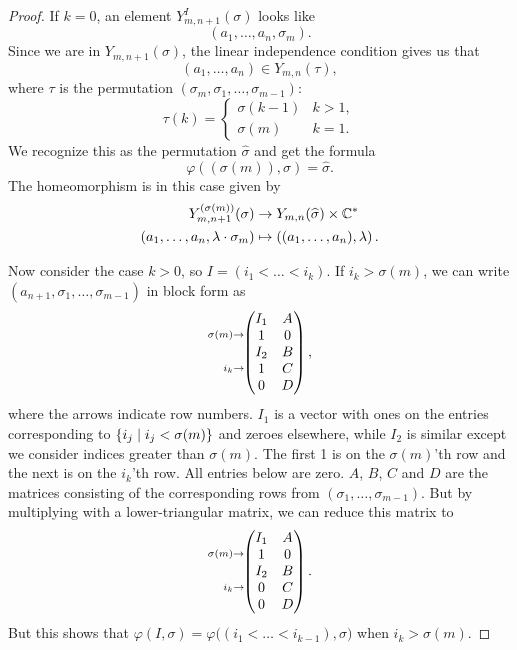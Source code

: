 \begin{proof}
  If $k = 0$, an element $Y^I_{m,n+1}(\sigma)$ looks like
  \[ (a_1,\dots,a_n,\sigma_m). \]
  Since we are in $Y_{m,n+1}(\sigma)$, the linear independence
  condition gives us that
  \[ (a_1,\dots,a_n) \in Y_{m,n}(\tau), \]
  where $\tau$ is the permutation
  $(\sigma_m,\sigma_1,\dots,\sigma_{m-1})$:
  \[ \tau(k) =
  \begin{cases}
    \sigma(k-1) & k > 1, \\
    \sigma(m) & k = 1.
  \end{cases} \]
  We recognize this as the permutation $\widehat\sigma$ and get the
  formula
  \[ \varphi((\sigma(m)),\sigma) = \widehat\sigma. \]
  The homeomorphism is in this case given by
  \begin{align*}
    Y_{m,n+1}^{(\sigma(m))}(\sigma) &\to Y_{m,n}(\widehat\sigma)\times
                                      \mathbb{C}^* \\
    (a_1,\dots,a_n,\lambda\cdot\sigma_m) &\mapsto
                                           \left((a_1,\dots,a_n),
                                           \lambda\right).
  \end{align*}
  
  Now consider the case $k > 0$, so $I = (i_1 < \dots < i_k)$. If $i_k
  > \sigma(m)$, we can write
  $(a_{n+1},\sigma_1,\dots,\sigma_{m-1})$ in block form as
  \[\xy
  (-8,4.5)*{\scriptstyle\sigma(m)\to};
  (-6,-4)*{\scriptstyle i_k\to};
  (5,0)*{\begin{pmatrix}
    I_1 & A \\
    1 & 0 \\
    I_2 & B \\
    1 & C \\
    0 & D
  \end{pmatrix},};
  \endxy
  \]
  where the arrows indicate row numbers.
  $I_1$ is a vector with ones on the entries corresponding
  to $\left\{ i_j \mid i_j < \sigma(m) \right\}$ and zeroes elsewhere, while
  $I_2$ is similar except we consider indices greater than
  $\sigma(m)$. The first 1 is on the $\sigma(m)$'th row and the next
  is on the $i_k$'th row. All entries below are zero. $A$, $B$, $C$
  and $D$ are the matrices consisting of the corresponding rows from
  $(\sigma_1,\dots,\sigma_{m-1})$. But by multiplying with a
  lower-triangular matrix, we can reduce this matrix to
  \[\xy
  (-8,4.5)*{\scriptstyle\sigma(m)\to};
  (-6,-4)*{\scriptstyle i_k\to};
  (5,0)*{\begin{pmatrix}
      I_1 & A \\
      1 & 0 \\
      I_2 & B \\
      0 & C \\
      0 & D
    \end{pmatrix}.};
  \endxy
  \]
  But this shows that $\varphi(I,\sigma) =
  \varphi\big((i_1<\dots<i_{k-1}),\sigma\big)$ when $i_k >
  \sigma(m)$.


\end{proof}
